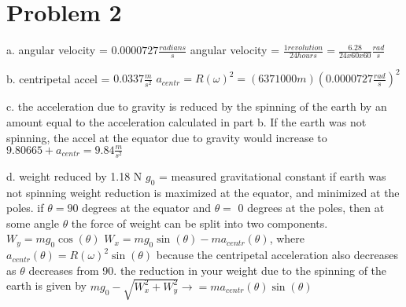 \chapter{Problem 2}
\label{Problem 2}
a. angular velocity = $0.0000727 \frac{radians}{s}$\newline
angular velocity = $\frac{1 revolution}{24 hours} = \frac{6.28}{24 x 60 x 60}\frac{rad}{s}$\newline

b. centripetal accel = $0.0337 \frac{m}{s^{2}}$ \newline
$a_{centr} = R(\omega)^{2} = (6371000 m)(0.0000727 \frac{rad}{s})^{2}$\newline

c. the acceleration due to gravity is reduced by the spinning of the earth\newline
by an amount equal to the acceleration calculated in part b.  If the earth\newline
was not spinning, the accel at the equator due to gravity would increase to\newline
$9.80665 + a_{centr} = 9.84 \frac{m}{s^2}$\newline

d. weight reduced by 1.18 N\newline
$g_{0}$ = measured gravitational constant if earth was not spinning
weight reduction is maximized at the equator, and minimized at the poles.\newline
if $\theta = 90$ degrees at the equator and $\theta =$ 0 degrees at the poles, then\newline
at some angle $\theta$ the force of weight can be split into two components.\newline
$W_{y} = mg_{0}\cos(\theta)$\newline
$W_{x} = mg_{0}\sin(\theta) - ma_{centr}(\theta)$, where $a_{centr}(\theta) = R(\omega)^{2}\sin(\theta)$\newline
because the centripetal acceleration also decreases as $\theta$ decreases from 90.\newline
the reduction in your weight due to the spinning of the earth is given by\newline
$mg_{0} - \sqrt{W_{x}^{2} + W_{y}^{2}} \rightarrow = ma_{centr}(\theta)\sin(\theta)$
